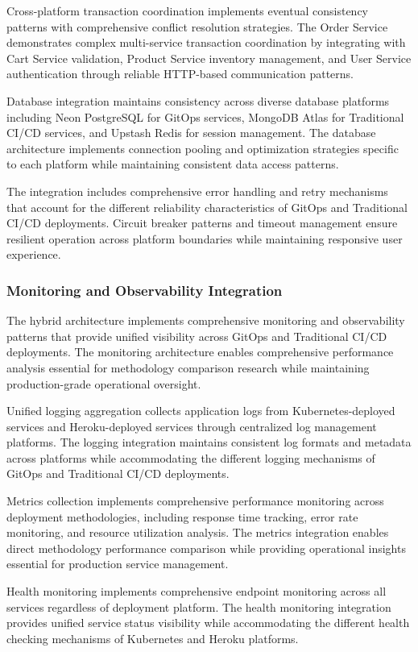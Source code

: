Cross-platform transaction coordination implements eventual consistency patterns with comprehensive conflict resolution strategies. The Order Service demonstrates complex multi-service transaction coordination by integrating with Cart Service validation, Product Service inventory management, and User Service authentication through reliable HTTP-based communication patterns.

Database integration maintains consistency across diverse database platforms including Neon PostgreSQL for GitOps services, MongoDB Atlas for Traditional CI/CD services, and Upstash Redis for session management. The database architecture implements connection pooling and optimization strategies specific to each platform while maintaining consistent data access patterns.

The integration includes comprehensive error handling and retry mechanisms that account for the different reliability characteristics of GitOps and Traditional CI/CD deployments. Circuit breaker patterns and timeout management ensure resilient operation across platform boundaries while maintaining responsive user experience.

\subsubsection{Monitoring and Observability Integration}

The hybrid architecture implements comprehensive monitoring and observability patterns that provide unified visibility across GitOps and Traditional CI/CD deployments. The monitoring architecture enables comprehensive performance analysis essential for methodology comparison research while maintaining production-grade operational oversight.

Unified logging aggregation collects application logs from Kubernetes-deployed services and Heroku-deployed services through centralized log management platforms. The logging integration maintains consistent log formats and metadata across platforms while accommodating the different logging mechanisms of GitOps and Traditional CI/CD deployments.

Metrics collection implements comprehensive performance monitoring across deployment methodologies, including response time tracking, error rate monitoring, and resource utilization analysis. The metrics integration enables direct methodology performance comparison while providing operational insights essential for production service management.

Health monitoring implements comprehensive endpoint monitoring across all services regardless of deployment platform. The health monitoring integration provides unified service status visibility while accommodating the different health checking mechanisms of Kubernetes and Heroku platforms.